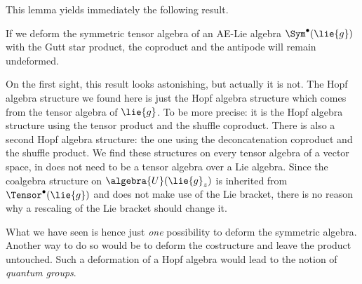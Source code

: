 This lemma yields immediately the following result.
\begin{corollary}
	If we deform the symmetric tensor algebra of an AE-Lie algebra 
	$\Sym^{\bullet}(\lie{g})$ with the Gutt star product, the coproduct 
	and the antipode will remain undeformed.
\end{corollary}
\begin{remark}
	\mbox{}
	\begin{remarklist}
		\item
		On the first sight, this result looks astonishing, but actually it is 
		not. The Hopf algebra structure we found here is just the Hopf algebra 
		structure which comes from the tensor algebra of $\lie{g}$. To be more 
		precise: it is the Hopf algebra structure using the tensor product and 
		the shuffle coproduct. There is also a second Hopf algebra structure: the 
		one using the deconcatenation coproduct and the shuffle product. We find 
		these structures on every tensor algebra of a vector space, in does not 
		need to be a tensor algebra over a Lie algebra. Since the coalgebra 
		structure on $\algebra{U}(\lie{g}_z)$ is inherited from 
		$\Tensor^{\bullet}(\lie{g})$ and does not make use of the Lie bracket, 
		there is no reason why a rescaling of the Lie bracket should change it.
		
		\item
		What we have seen is hence just \emph{one} possibility to deform the 
		symmetric algebra. Another way to do so would be to deform the 
		costructure and leave the product untouched. Such a deformation of a Hopf 
		algebra would lead to the notion of \emph{quantum groups}.
	\end{remarklist}
\end{remark}

%


